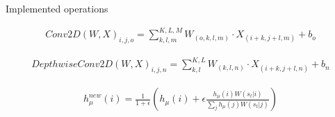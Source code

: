 \documentclass[final]{beamer}
\newlength{\onecolwid}
\newlength{\twocolwid}
\begin{document}
\begin{frame}[t]
\begin{columns}[t]
\begin{column}{\twocolwid}
\begin{columns}[t,totalwidth=\twocolwid]
\end{columns} %


\begin{alertblock}{Implemented operations}
	
\begin{eqnarray} \label{eq:conv2D}
Conv2D\left(W,X\right)_{i,j,o}=\sum_{k,l,m}^{K,L,M}W_{(o,k,l,m)} \cdot X_{(i+k,j+l,m)}+b_{o}
\end{eqnarray}


\begin{eqnarray} \label{eq:dconv2D}
DepthwiseConv2D\left(W,X\right)_{i,j,n}=\sum_{k,l}^{K,L}W_{(k,l,n)} \cdot X_{(i+k,j+l,n)}+b_{n}
\end{eqnarray}

\begin{eqnarray} \label{eq:sbs_update}
h_\mu^{new}(i) = \frac{1}{1+\epsilon} \left(h_\mu(i) + \epsilon \frac{h_\mu(i) W(s_t|i) }{\sum_j h_\mu(j) W(s_t|j)} \right) 
\end{eqnarray}

\end{alertblock} 


\begin{columns}[t,totalwidth=\twocolwid] %

\begin{column}{\onecolwid} %




\end{column} %

\begin{column}{\onecolwid} %

\end{column} %

\end{columns} %

\end{column} %


\end{columns}
\end{frame}
\end{document}

